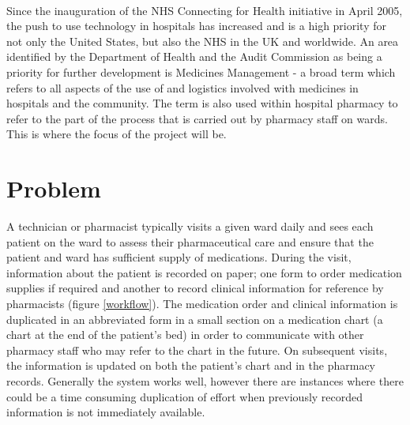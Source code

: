 \documentclass[letterpaper]{amsart}
\begin{document}
\paragraph{}
Since the inauguration of the NHS Connecting for Health initiative in April 2005, the push to use technology in hospitals has increased and is a high priority for not only the United States, but also the NHS in the UK and worldwide.
An area identified by the Department of Health and the Audit Commission as being a priority for further development is Medicines Management - a broad term which refers to all aspects of the use of and logistics involved with medicines in hospitals and the community.\cite{spsugar} The term is also used within hospital pharmacy to refer to the part of the process that is carried out by pharmacy staff on wards.  This is where the focus of the project will be.
\section{Problem}
A technician or pharmacist typically visits a given ward daily and sees each patient on the ward to assess their pharmaceutical care and ensure that the patient and ward has sufficient supply of medications. During the visit, information about the patient is recorded on paper; one form to order medication supplies if required and another to record clinical information for reference by pharmacists (figure \ref{workflow}).  The medication order and clinical information is duplicated in an abbreviated form in a small section on a medication chart (a chart at the end of the patient's bed) in order to communicate with other pharmacy staff who may refer to the chart in the future.  On subsequent visits, the information is updated on both the patient's chart and in the pharmacy records.
Generally the system works well, however there are instances where there could be a time consuming duplication of effort when previously recorded information is not immediately available.  
\end{document}
